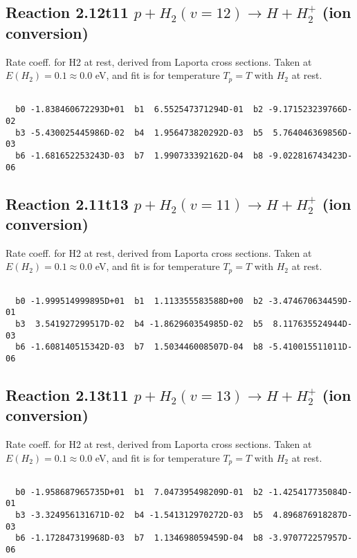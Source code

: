 \newpage
\subsection{
Reaction 2.12t11
$ p + H_2(v=12) \rightarrow H + H_2^+$ (ion conversion)
}
Rate coeff. for H2 at rest, derived from Laporta cross sections.
Taken at $E(H_2) = 0.1 \approx 0.0$ eV,  and fit is for temperature $T_p=T$ with $H_2$ at rest.

\begin{small}\begin{verbatim}

  b0 -1.838460672293D+01  b1  6.552547371294D-01  b2 -9.171523239766D-02
  b3 -5.430025445986D-02  b4  1.956473820292D-03  b5  5.764046369856D-03
  b6 -1.681652253243D-03  b7  1.990733392162D-04  b8 -9.022816743423D-06

\end{verbatim}\end{small}

\newpage
\subsection{
Reaction 2.11t13
$ p + H_2(v=11) \rightarrow H + H_2^+$ (ion conversion)
}
Rate coeff. for H2 at rest, derived from Laporta cross sections.
Taken at $E(H_2) = 0.1 \approx 0.0$ eV,  and fit is for temperature $T_p=T$ with $H_2$ at rest.

\begin{small}\begin{verbatim}

  b0 -1.999514999895D+01  b1  1.113355583588D+00  b2 -3.474670634459D-01
  b3  3.541927299517D-02  b4 -1.862960354985D-02  b5  8.117635524944D-03
  b6 -1.608140515342D-03  b7  1.503446008507D-04  b8 -5.410015511011D-06

\end{verbatim}\end{small}

\newpage
\subsection{
Reaction 2.13t11
$ p + H_2(v=13) \rightarrow H + H_2^+$ (ion conversion)
}
Rate coeff. for H2 at rest, derived from Laporta cross sections.
Taken at $E(H_2) = 0.1 \approx 0.0$ eV,  and fit is for temperature $T_p=T$ with $H_2$ at rest.

\begin{small}\begin{verbatim}

  b0 -1.958687965735D+01  b1  7.047395498209D-01  b2 -1.425417735084D-01
  b3 -3.324956131671D-02  b4 -1.541312970272D-03  b5  4.896876918287D-03
  b6 -1.172847319968D-03  b7  1.134698059459D-04  b8 -3.970772257957D-06

\end{verbatim}\end{small}

